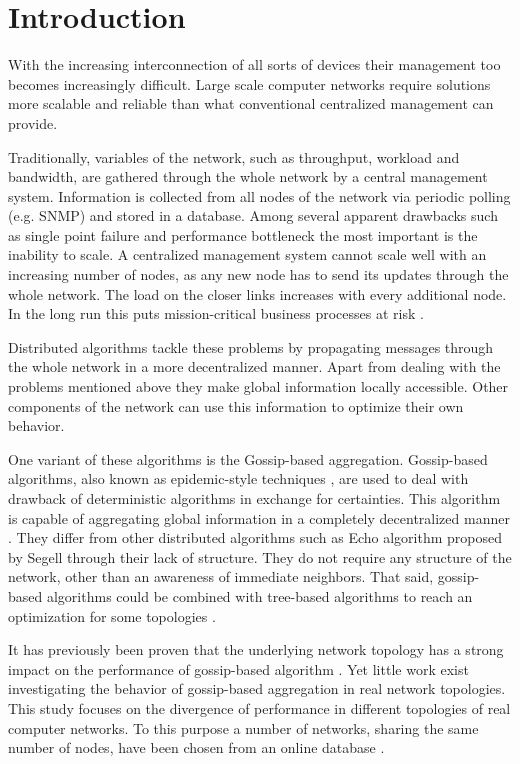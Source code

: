 \section{Introduction}
\label{sec:theory}
With the increasing interconnection of all sorts of devices their management too becomes increasingly difficult. Large scale computer networks require solutions more scalable and reliable than what conventional centralized management can provide.

Traditionally, variables of the network, such as throughput, workload and bandwidth, are gathered through the whole network by a central management system. Information is collected from all nodes of the network via periodic polling (e.g. SNMP) and stored in a database. Among several apparent drawbacks such as single point failure and performance bottleneck the most important is the inability to scale. A centralized management system cannot scale well with an increasing number of nodes, as any new node has to send its updates through the whole network. The load on the closer links increases with every additional node. In the long run this puts mission-critical business processes at risk \cite{Stadler529980}.

Distributed algorithms tackle these problems by propagating messages through the whole network in a more decentralized manner. Apart from dealing with the problems mentioned above they make global information locally accessible. Other components of the network can use this information to optimize their own behavior\cite{jelasity_gossip-based_2005}.

One variant of these algorithms is the Gossip-based aggregation. Gossip-based algorithms, also known as epidemic-style techniques \cite{I.Gupta2006}, are used to deal with drawback of deterministic algorithms in exchange for certainties. This algorithm is capable of aggregating global information in a completely decentralized manner \cite{jelasity_gossip-based_2005}. They differ from other distributed algorithms such as Echo algorithm proposed by Segell \cite{SegallG89} through their lack of structure. They do not require any structure of the network, other than an awareness of immediate neighbors. That said, gossip-based algorithms could be combined with tree-based algorithms to reach an optimization for some topologies \cite{KyasanurCG06}.

It has previously been proven that the underlying network topology has a strong impact on the performance of gossip-based algorithm \cite{5929538, jelasity_gossip-based_2003}. Yet little work exist investigating the behavior of gossip-based aggregation in real network topologies. This study focuses on the divergence of performance in different topologies of real computer networks. To this purpose a number of networks, sharing the same number of nodes, have been chosen from an online database \cite{knight_internet_2011}.


